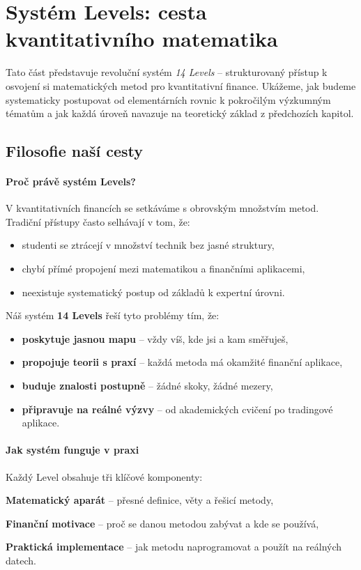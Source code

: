 \section{Systém Levels: cesta kvantitativního matematika}
\label{sec:system-levels}

Tato část představuje revoluční systém \emph{14 Levels} -- strukturovaný přístup k osvojení si
matematických metod pro kvantitativní finance. Ukážeme, jak budeme systematicky postupovat od
elementárních rovnic k pokročilým výzkumným tématům a jak každá úroveň navazuje na teoretický
základ z předchozích kapitol.

\spc

\subsection{Filosofie naší cesty}
\label{sec:filosofie-cesty}

\paragraph{Proč právě systém Levels?}
V kvantitativních financích se setkáváme s obrovským množstvím metod. Tradiční přístupy často selhávají v tom, že:
\begin{itemize}
  \item studenti se ztrácejí v množství technik bez jasné struktury,
  \item chybí přímé propojení mezi matematikou a finančními aplikacemi,
  \item neexistuje systematický postup od základů k expertní úrovni.
\end{itemize}
Náš systém \textbf{14 Levels} řeší tyto problémy tím, že:
\begin{itemize}
  \item \textbf{poskytuje jasnou mapu} -- vždy víš, kde jsi a kam směřuješ,
  \item \textbf{propojuje teorii s praxí} -- každá metoda má okamžité finanční aplikace,
  \item \textbf{buduje znalosti postupně} -- žádné skoky, žádné mezery,
  \item \textbf{připravuje na reálné výzvy} -- od akademických cvičení po tradingové aplikace.
\end{itemize}

\paragraph{Jak systém funguje v praxi}
Každý Level obsahuje tři klíčové komponenty:
\begin{romanenum}
  \item \textbf{Matematický aparát} -- přesné definice, věty a řešicí metody,
  \item \textbf{Finanční motivace} -- proč se danou metodou zabývat a kde se používá,
  \item \textbf{Praktická implementace} -- jak metodu naprogramovat a použít na reálných datech.
\end{romanenum}

